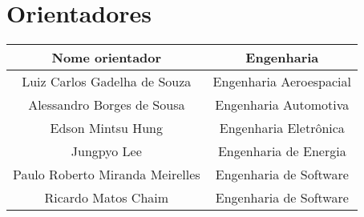 \chapter*{Orientadores}
\begin{table}[ht!]
\centering
\label{my-label}
\begin{tabular}{|c|c|}
Nome orientador   &  Engenharia \\ \hline

Luiz Carlos Gadelha de Souza & Engenharia Aeroespacial \\ \hline
Alessandro Borges de Sousa & Engenharia Automotiva \\ \hline
Edson Mintsu Hung & Engenharia Eletrônica \\ \hline
Jungpyo Lee & Engenharia de Energia \\ \hline
Paulo Roberto Miranda Meirelles & Engenharia de Software \\
Ricardo Matos Chaim & Engenharia de Software \\ \hline
\end{tabular}
\end{table}
